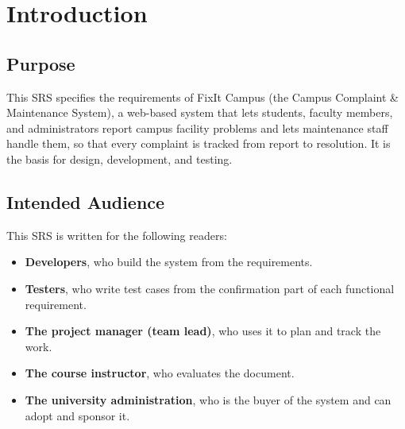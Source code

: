 \chapter{Introduction}
\label{ch:intro}

\section{Purpose}
This SRS specifies the requirements of FixIt Campus (the Campus Complaint \& Maintenance System), a web-based system that lets students, faculty members, and administrators report campus facility problems and lets maintenance staff handle them, so that every complaint is tracked from report to resolution. It is the basis for design, development, and testing.

\section{Intended Audience}
This SRS is written for the following readers:

\begin{itemize}
  \item \textbf{Developers}, who build the system from the requirements.
  \item \textbf{Testers}, who write test cases from the confirmation part of each functional requirement.
  \item \textbf{The project manager (team lead)}, who uses it to plan and track the work.
  \item \textbf{The course instructor}, who evaluates the document.
  \item \textbf{The university administration}, who is the buyer of the system and can adopt and sponsor it.
\end{itemize}

